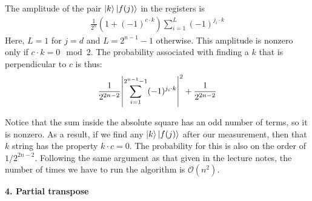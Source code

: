 \documentclass{article}
\theoremstyle{definition}
\newcommand{\f}[2]{\frac{#1}{#2}}
\begin{document}
\begin{enumerate}[label=(\alph*)]
	The amplitude of the pair $\ket{k}\ket{f(j)}$ in the registers is 
	\begin{align*}
		\f{1}{2^n}(1 + (-1)^{c\cdot k}) \sum_{i=1}^L (-1)^{j_i\cdot k}
	\end{align*} 
	Here, $L=1$ for $j=d$ and $L = 2^{n-1}-1$ otherwise. This amplitude is nonzero only if $c\cdot k = 0 \mod 2$. The probability associated with finding a $k$ that is perpendicular to $c$ is thus:
	\begin{align*}
		\f{1}{2^{2n-2}} \abs{\sum_{i=1}^{2^{n-1}-1} (-1)^{j_i\cdot k}}^2 + \f{1}{2^{2n-2}}
	\end{align*}
	
	Notice that the sum inside the absolute square has an odd number of terms, so it is nonzero. As a result, if we find any $\ket{k}\ket{f(j)}$ after our measurement, then that $k$ string has the property $k\cdot c = 0$.   The probability for this is also on the order of $1/2^{2n-2}$. Following the same argument as that given in the lecture notes, the number of times we have to run the algorithm is $\mathcal{O}(n^2)$. 
	
	

\end{enumerate}



\noindent \textbf{4. Partial transpose}
\end{document}
